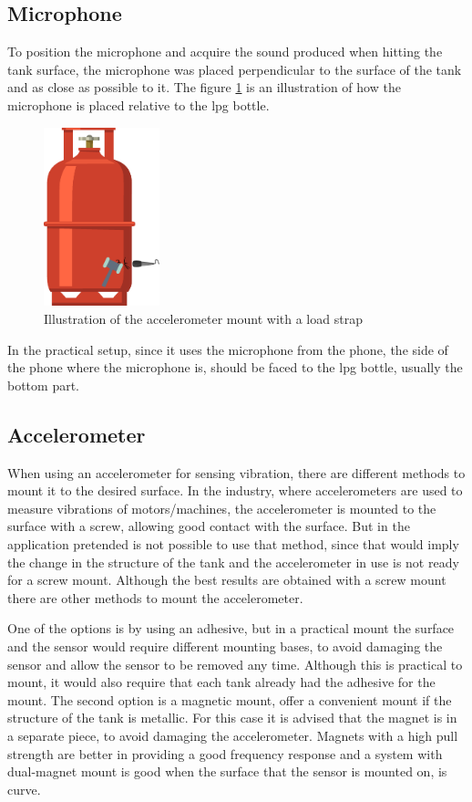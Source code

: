 \subsection{Microphone}
To position the microphone and acquire the sound produced when hitting the tank surface, the microphone was placed perpendicular to the surface of the tank and as close as possible to it. The figure \ref{fig:micmount} is an illustration of how the microphone is placed relative to the \acrshort{lpg} bottle.
\begin{figure}[]
    \centering
    \includegraphics[width=0.3\textwidth]{Chapters/4CHP/Figures/micWimpactHamm.eps}
    \caption{Illustration of the accelerometer mount with a load strap}
    \label{fig:micmount}
\end{figure}
In the practical setup, since it uses the microphone from the phone, the side of the phone where the microphone is, should be faced to the \acrshort{lpg} bottle, usually the bottom part.
\subsection{Accelerometer}
When using an accelerometer for sensing vibration, there are different methods to mount it to the desired surface. In the industry, where accelerometers are used to measure vibrations of motors/machines, the accelerometer is mounted to the surface with a screw, allowing good contact with the surface. But in the application pretended is not possible to use that method, since that would imply the change in the structure of the tank and the accelerometer in use is not ready for a screw mount. Although the best results are obtained with a screw mount there are other methods to mount the accelerometer. 

One of the options is by using an adhesive, but in a practical mount the surface and the sensor would require different mounting bases, to avoid damaging the sensor and allow the sensor to be removed any time. Although this is practical to mount, it would also require that each tank already had the adhesive for the mount. The second option is a magnetic mount, offer a convenient mount if the structure of the tank is metallic. For this case it is advised that the magnet is in a separate piece, to avoid damaging the accelerometer. Magnets with a high pull strength are better in providing a good frequency response and a system with dual-magnet mount is good when the surface that the sensor is mounted on, is curve\cite{GuidelinesMountingTest}.

